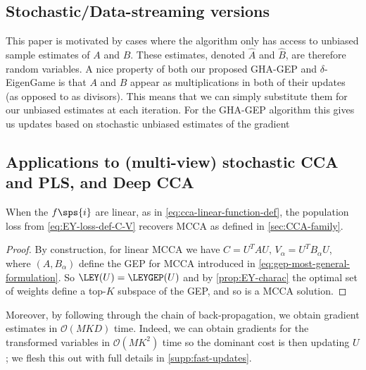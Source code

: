 \subsection{Stochastic/Data-streaming versions}

This paper is motivated by cases where the algorithm only has access to unbiased sample estimates of $A$ and $B$. These estimates, denoted $\hat{A}$ and $\hat{B}$, are therefore random variables. A nice property of both our proposed GHA-GEP and $\delta$-EigenGame is that $A$ and $B$ appear as multiplications in both of their updates (as opposed to as divisors). This means that we can simply substitute them for our unbiased estimates at each iteration. For the GHA-GEP algorithm this gives us updates based on stochastic unbiased estimates of the gradient

\subsection{Applications to (multi-view) stochastic CCA and PLS, and Deep CCA}
\begin{lemma}
    When the $f\sps{i}$ are linear, as in \cref{eq:cca-linear-function-def}, the population loss from \cref{eq:EY-loss-def-C-V} recovers MCCA as defined in \cref{sec:CCA-family}. %
\end{lemma}
\begin{proof}
    By construction, for linear MCCA we have $C = U^T A U,\, V_\alpha=U^T B_\alpha U$, where $(A, B_\alpha)$ define the GEP for MCCA introduced in \cref{eq:gep-most-general-formulation}.
    So $\LEY(U) = \LEYGEP(U)$ and by \cref{prop:EY-charac} the optimal set of weights define a top-$K$ subspace of the GEP, and so is a MCCA solution.
\end{proof}

Moreover, by following through the chain of back-propagation, we obtain gradient estimates in $\mathcal{O}(MKD)$ time.
Indeed, we can obtain gradients for the transformed variables in $\mathcal{O}(M K^2)$ time so the dominant cost is then updating $U$; we flesh this out with full details in \cref{supp:fast-updates}.

